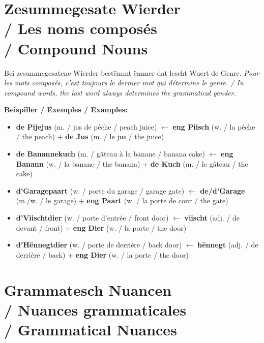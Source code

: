 \vspace{1cm}

\section[Zesummegesate Wierder / Noms Composés / Compound Nouns]{Zesummegesate Wierder \\/ Les noms composés \\/ Compound Nouns}

Bei zesummegesatene Wierder bestëmmt ëmmer dat lescht Wuert de Genre. \textit{Pour les mots composés, c'est toujours le dernier mot qui détermine le genre. / In compound words, the last word always determines the grammatical gender.}

\vspace{0.5em}
\textbf{Beispiller / Exemples / Examples:}
\begin{itemize}
    \item \textbf{de Pijejus} (m. / jus de pêche / peach juice) $\leftarrow$ \textbf{eng Piisch} (w. / la pêche / the peach) + \textbf{de Jus} (m. / le jus / the juice)
    \item \textbf{de Banannekuch} (m. / gâteau à la banane / banana cake) $\leftarrow$ \textbf{eng Banann} (w. / la banane / the banana) + \textbf{de Kuch} (m. / le gâteau / the cake)
    \item \textbf{d'Garagepaart} (w. / porte du garage / garage gate) $\leftarrow$ \textbf{de/d'Garage} (m./w. / le garage) + \textbf{eng Paart} (w. / la porte de cour / the gate)
    \item \textbf{d'Viischtdier} (w. / porte d'entrée / front door) $\leftarrow$ \textbf{viischt} (adj. / de devant / front) + \textbf{eng Dier} (w. / la porte / the door)
    \item \textbf{d'Hënnegtdier} (w. / porte de derrière / back door) $\leftarrow$ \textbf{hënnegt} (adj. / de derrière / back) + \textbf{eng Dier} (w. / la porte / the door)
\end{itemize}

\vspace{1cm}

\section[Grammatesch Nuancen / Nuances / Grammatical Nuances]{Grammatesch Nuancen \\/ Nuances grammaticales \\/ Grammatical Nuances}

